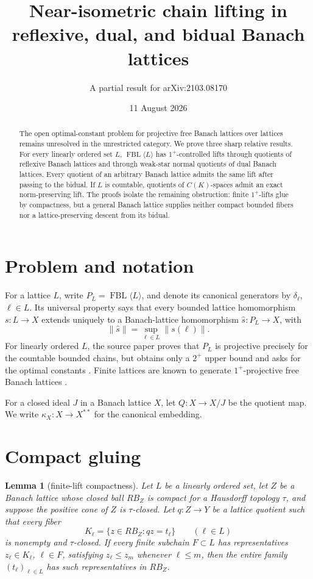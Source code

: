 \documentclass[11pt]{article}
\title{Near-isometric chain lifting in reflexive, dual, and bidual Banach lattices}
\author{A partial result for arXiv:2103.08170}
\date{11 August 2026}
\newtheorem{lemma}{Lemma}
\newcommand{\FBL}{\operatorname{FBL}}
\begin{document}
\maketitle

\begin{abstract}
The open optimal-constant problem for projective free Banach lattices over
lattices remains unresolved in the unrestricted category.  We prove three
sharp relative results.  For every linearly ordered set \(L\),
\(\FBL\langle L\rangle\) has \(1^+\)-controlled lifts through quotients of
reflexive Banach lattices and through weak-star normal quotients of dual
Banach lattices.  Every quotient of an arbitrary Banach lattice admits the
same lift after passing to the bidual.  If \(L\) is countable, quotients of
\(C(K)\)-spaces admit an exact norm-preserving lift.  The proofs isolate the
remaining obstruction: finite \(1^+\)-lifts glue by compactness, but a
general Banach lattice supplies neither compact bounded fibers nor a
lattice-preserving descent from its bidual.
\end{abstract}

\section{Problem and notation}

For a lattice \(L\), write \(P_L=\FBL\langle L\rangle\), and denote its
canonical generators by \(\delta_\ell\), \(\ell\in L\).  Its universal
property says that every bounded lattice homomorphism \(s:L\to X\) extends
uniquely to a Banach-lattice homomorphism
\(\widehat s:P_L\to X\), with
\[
 \|\widehat s\|=\sup_{\ell\in L}\|s(\ell)\|.
\]
For linearly ordered \(L\), the source paper proves that \(P_L\) is
projective precisely for the countable bounded chains, but obtains only a
\(2^+\) upper bound and asks
for the optimal constants \cite{AMRR}.  Finite lattices are known to
generate \(1^+\)-projective free Banach lattices \cite{AR}.

For a closed ideal \(J\) in a Banach lattice \(X\), let
\(Q:X\to X/J\) be the quotient map.  We write
\(\kappa_X:X\to X^{**}\) for the canonical embedding.

\section{Compact gluing}

\begin{lemma}[finite-lift compactness]\label{lem:compact}
Let \(L\) be a linearly ordered set, let \(Z\) be a Banach lattice whose
closed ball \(RB_Z\) is compact for a Hausdorff topology \(\tau\), and
suppose the positive cone of \(Z\) is \(\tau\)-closed.  Let
\(q:Z\to Y\) be a lattice quotient such that every fiber
\[
 K_\ell=\{z\in RB_Z:qz=t_\ell\}\qquad(\ell\in L)
\]
is nonempty and \(\tau\)-closed.  If every finite subchain \(F\subset L\)
has representatives \(z_\ell\in K_\ell\), \(\ell\in F\), satisfying
\(z_\ell\le z_m\) whenever \(\ell\le m\), then the entire family
\((t_\ell)_{\ell\in L}\) has such representatives in \(RB_Z\).
\end{lemma}
\end{document}
